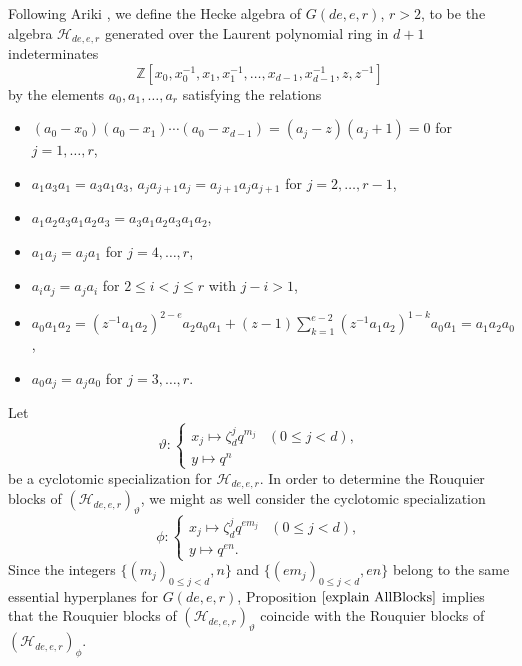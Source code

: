 \documentclass[10pt,a4paper,titlepage]{article}
\begin{document}
Following Ariki \cite{Ariki}, we define the 
 Hecke algebra of $G(de,e,r)$, $r >2$, to be the algebra $\mathcal{H}_{de,e,r}$ generated over the Laurent polynomial ring in $d+1$ indeterminates  
$$\mathbb{Z}[x_0,x_0^{-1},x_1,x_1^{-1},\ldots,x_{d-1},x_{d-1}^{-1},z,z^{-1}]$$
by the elements $a_0,a_1,\ldots,a_r$ satisfying the relations
\begin{itemize}
\item $(a_0-x_0)(a_0-x_1)\cdots(a_0-x_{d-1})=(a_j-z)(a_j+1)=0$ for $j=1,\ldots,r$,
\item $a_1a_3a_1=a_3a_1a_3$, $a_ja_{j+1}a_j=a_{j+1}a_ja_{j+1}$ for $j=2,\ldots,r-1$,
\item $a_1a_2a_3a_1a_2a_3=a_3a_1a_2a_3a_1a_2$,
\item $a_1a_j=a_ja_1$ for $j=4,\ldots,r$,
\item $a_i a_j=a_j a_i$  for $2 \leq i <j \leq r$ with $j-i>1$,
\item $a_0a_1a_2=(z^{-1}a_1a_2)^{2-e}a_2a_0a_1+(z-1)\sum_{k=1}^{e-2}(z^{-1}a_1a_2)^{1-k}a_0a_1=a_1a_2a_0$,
\item $a_0a_j=a_ja_0$ for $j=3,\ldots,r$.
\end{itemize}
Let $$\vartheta : \left\{ 
\begin{array}{ll} 
x_j \mapsto \zeta_d^j q^{m_j} &(0 \leq j <d),\\ 
y \mapsto q^n
\end{array} \right. 
$$
be a cyclotomic specialization for  $\mathcal{H}_{de,e,r}$. In order to determine the Rouquier blocks of 
$(\mathcal{H}_{de,e,r})_\vartheta$, we might as well consider the cyclotomic specialization
$$\phi : \left\{ 
\begin{array}{ll} 
x_j \mapsto \zeta_d^j q^{em_j} &(0 \leq j <d),\\ 
y \mapsto q^{en}.
\end{array} \right. 
$$
Since the integers $\{(m_j)_{0 \leq j <d},n\}$ and $\{(em_j)_{0 \leq j <d},en\}$ belong to the same essential hyperplanes for $G(de,e,r)$, Proposition $\ref{explain AllBlocks}$ implies that the Rouquier blocks of $(\mathcal{H}_{de,e,r})_\vartheta$ coincide with the Rouquier blocks of $(\mathcal{H}_{de,e,r})_\phi$.\\
\end{document}
